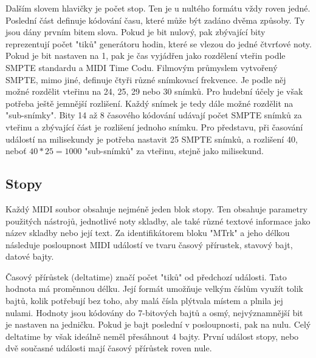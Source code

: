 Dalším slovem hlavičky je počet stop.
Ten je u nultého formátu vždy roven jedné.
Poslední část definuje kódování času, 
které může být zadáno dvěma způsoby.
Ty jsou dány prvním bitem slova.
Pokud je bit nulový, 
pak zbývající bity reprezentují počet "tiků" generátoru hodin, 
které se vlezou do jedné čtvrťové noty.
Pokud je bit nastaven na 1, 
pak je čas vyjádřen jako rozdělení vteřin podle SMPTE standardu
a MIDI Time Codu.
\cite{Back_SMF_Specif}
Filmovým průmyslem vytvořený SMPTE, mimo jiné, 
definuje čtyři různé snímkovací frekvence.
Je podle něj možné rozdělit vteřinu na 24, 25, 29 nebo 30 snímků.
Pro hudební účely je však potřeba ještě jemnější rozlišení.
Každý snímek je tedy dále možné rozdělit na "sub-snímky".
\cite{Neznamy_aboutMIDIFiles}
Bity 14 až 8 časového kódování udávají počet SMPTE snímků za vteřinu 
a zbývající část je rozlišení jednoho snímku.
Pro představu,
při časování událostí na milisekundy je potřeba nastavit 25 SMPTE snímků,
a rozlišení 40, neboť $ 40 * 25 = 1000 $ "sub-snímků" za vteřinu, 
stejně jako milisekund. 
\cite{Back_SMF_Specif}
\par

\subsection{Stopy}
Každý MIDI soubor obsahuje nejméně jeden blok stopy.
Ten obsahuje parametry použitých nástrojů, jednotlivé noty skladby, 
ale také různé textové informace jako název skladby nebo její text.
Za identifikátorem bloku "MTrk" a jeho délkou 
následuje posloupnost MIDI událostí
ve tvaru časový přírustek, stavový bajt, datové bajty.
\cite{Back_SMF_Specif}
\par

Časový přírůstek (deltatime) značí počet "tiků" od předchozí události.
Tato hodnota má proměnnou délku.
Její formát umožňuje velkým číslům využít tolik bajtů, 
kolik potřebují bez toho,
aby malá čísla plýtvala místem a plnila jej nulami.
Hodnoty jsou kódovány do 7-bitových bajtů 
a osmý, nejvýznamnější bit je nastaven na jedničku.
Pokud je bajt poslední v posloupnosti, pak na nulu.
Celý deltatime by však ideálně neměl přesáhnout 4 bajty.
\cite{Neznamy_aboutMIDIFiles}
První událost stopy, nebo dvě současné události 
mají časový přírůstek roven nule.
\cite{Back_SMF_Specif}
\par

